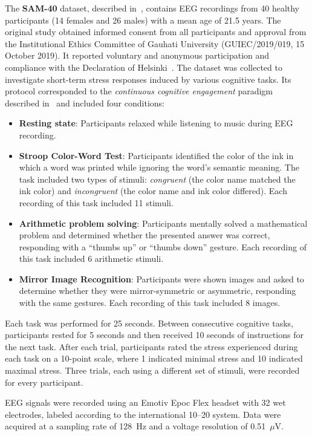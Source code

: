 \documentclass[10pt,letterpaper]{article}
\begin{document}
The \textbf{SAM-40} dataset, described in~\cite{ghosh2022sam40}, contains EEG recordings from 40 healthy participants (14 females and 26 males) with a mean age of 21.5 years. The original study obtained informed consent from all participants and approval from the Institutional Ethics Committee of Gauhati University (GUIEC/2019/019, 15 October 2019). It reported voluntary and anonymous participation and compliance with the Declaration of Helsinki~\cite{ghosh2022sam40}. The dataset was collected to investigate short-term stress responses induced by various cognitive tasks. Its protocol corresponded to the \textit{continuous cognitive engagement} paradigm described in~\cite{chen2025hybrid} and included four conditions:

\begin{itemize}
  \item \textbf{Resting state}: Participants relaxed while listening to music during EEG recording.
  \item \textbf{Stroop Color-Word Test}: Participants identified the color of the ink in which a word was printed while ignoring the word's semantic meaning. The task included two types of stimuli: \textit{congruent} (the color name matched the ink color) and \textit{incongruent} (the color name and ink color differed). Each recording of this task included 11 stimuli.
  \item \textbf{Arithmetic problem solving}: Participants mentally solved a mathematical problem and determined whether the presented answer was correct, responding with a ``thumbs up'' or ``thumbs down'' gesture. Each recording of this task included 6 arithmetic stimuli.
  \item \textbf{Mirror Image Recognition}: Participants were shown images and asked to determine whether they were mirror-symmetric or asymmetric, responding with the same gestures. Each recording of this task included 8 images.
\end{itemize}

Each task was performed for 25 seconds. Between consecutive cognitive tasks, participants rested for 5 seconds and then received 10 seconds of instructions for the next task. After each trial, participants rated the stress experienced during each task on a 10-point scale, where 1 indicated minimal stress and 10 indicated maximal stress. Three trials, each using a different set of stimuli, were recorded for every participant.

EEG signals were recorded using an Emotiv Epoc Flex headset with 32 wet electrodes, labeled according to the international 10--20 system. Data were acquired at a sampling rate of 128~Hz and a voltage resolution of 0.51~$\mu$V.
\end{document}
